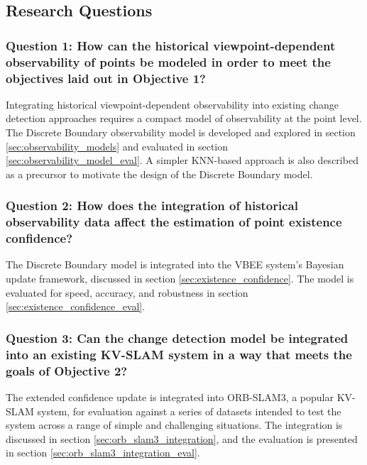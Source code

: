 \subsection{Research Questions}

\subsubsection*{Question 1: How can the historical viewpoint-dependent observability of points be modeled in order to meet the objectives laid out in Objective 1?}

Integrating historical viewpoint-dependent observability into existing change detection approaches requires a compact model of observability at the point level. The Discrete Boundary observability model is developed and explored in section \ref{sec:observability_models} and evaluated in section \ref{sec:observability_model_eval}. A simpler KNN-based approach is also described as a precursor to motivate the design of the Discrete Boundary model.

\subsubsection*{Question 2: How does the integration of historical observability data affect the estimation of point existence confidence?}

The Discrete Boundary model is integrated into the VBEE system's Bayesian update framework, discussed in section \ref{sec:existence_confidence}. The model is evaluated for speed, accuracy, and robustness in section \ref{sec:existence_confidence_eval}.

\subsubsection*{Question 3: Can the change detection model be integrated into an existing KV-SLAM system in a way that meets the goals of Objective 2?}

The extended confidence update is integrated into ORB-SLAM3, a popular KV-SLAM system, for evaluation against a series of datasets intended to test the system across a range of simple and challenging situations. The integration is discussed in section \ref{sec:orb_slam3_integration}, and the evaluation is presented in section \ref{sec:orb_slam3_integration_eval}.
